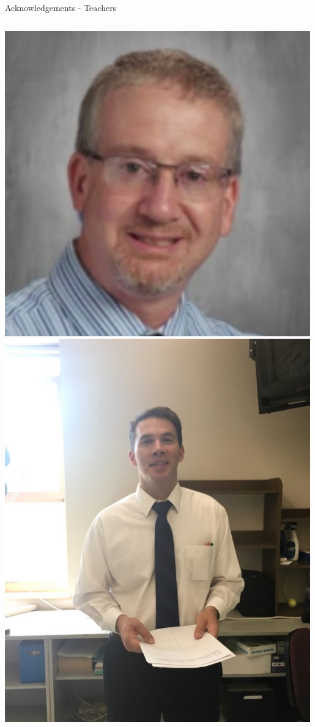 \documentclass[aspectratio=169]{beamer}
\begin{document}
\begin{frame}{Acknowledgements - Teachers}
\begin{columns}
            \centering
            \includegraphics[width=0.99\textwidth]{people/teachers/juice.png}
            \includegraphics[width=0.99\textwidth]{people/teachers/fuhr.png}

\end{columns}
\end{frame}
\end{document}
